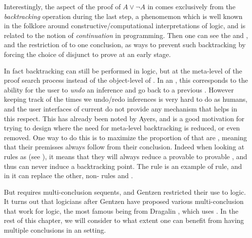 \begin{scope}
Interestingly, the  aspect of the proof of $A \lor \neg A$ in
 comes exclusively from the \emph{backtracking} operation during
the last step, a phenomemon which is well known in the folklore around
constructive/computational interpretations of  logic, and is
related to the notion of \emph{continuation} in programming. Then one can see the
 {} and {}, and the restriction
of   to one conclusion, as ways to prevent such
backtracking by forcing the choice of disjunct to prove at an early stage.

In fact backtracking can still be performed in  logic, but at
the meta-level of the proof search process instead of the object-level of
. In an , this corresponds to
the ability for the user to \emph{undo} an inference and go back to a previous
. However keeping track of the times we undo/redo inferences is
very hard to do as humans, and the user interfaces of current  do not provide any mechanism that helps in this respect. This has
already been noted by Ayers, and is a good motivation for trying to design  where the need for meta-level backtracking is reduced, or even removed.
One way to do this is to maximize the proportion of  that
are \emph{}, meaning that their premisses always follow from
their conclusion. Indeed when looking at rules as  (see
), it means that they will always reduce a provable
 to provable , and thus can never induce a backtracking
point. The {} rule is an example of  rule, and
in  it can replace the other, non- rules {}
and {}.

But {} requires multi-conclusion sequents, and Gentzen restricted
their use to  logic. It turns out that logicians after Gentzen have
proposed various multi-conclusion  that work for 
logic, the most famous being  from Dragalin
, which uses {}. In the rest of
this chapter, we will consider to what extent one can benefit from having
multiple conclusions in an  setting.


\end{scope}
